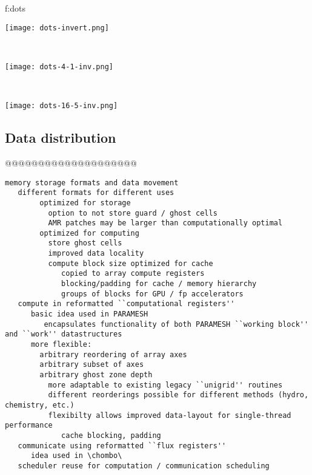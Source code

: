 \documentclass{article}
\begin{document}
{f:dots}{
\begin{minipage}{7.0in}
\begin{minipage}{2.2in}
\texttt{[image: dots-invert.png]}
\end{minipage} \ 
\begin{minipage}{2.2in}
\texttt{[image: dots-4-1-inv.png]}
\end{minipage} \ 
\begin{minipage}{2.2in}
\texttt{[image: dots-16-5-inv.png]}
\end{minipage}
\end{minipage}}

\subsection{Data distribution} \label{ss:design-distribution}

@@@@@@@@@@@@@@@@@@@@

\begin{verbatim}
memory storage formats and data movement
   different formats for different uses
        optimized for storage
          option to not store guard / ghost cells
          AMR patches may be larger than computationally optimal
        optimized for computing
          store ghost cells
          improved data locality
          compute block size optimized for cache
             copied to array compute registers
             blocking/padding for cache / memory hierarchy
             groups of blocks for GPU / fp accelerators
   compute in reformatted ``computational registers''
      basic idea used in PARAMESH
         encapsulates functionality of both PARAMESH ``working block'' and ``work'' datastructures
      more flexible:
        arbitrary reordering of array axes
        arbitrary subset of axes
        arbitrary ghost zone depth
          more adaptable to existing legacy ``unigrid'' routines
          different reorderings possible for different methods (hydro, chemistry, etc.)
          flexibilty allows improved data-layout for single-thread performance
             cache blocking, padding
   communicate using reformatted ``flux registers''
      idea used in \chombo\ 
   scheduler reuse for computation / communication scheduling
\end{verbatim}
\end{document}
